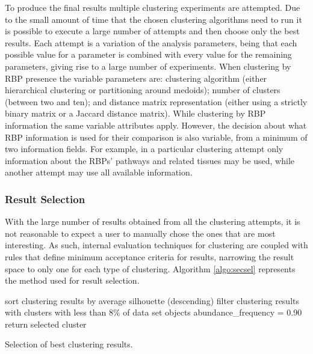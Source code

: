 To produce the final results multiple clustering experiments are attempted. Due
to the small amount of time that the chosen clustering algorithms need to run it
is possible to execute a large number of attempts and then choose only the best
results. Each attempt is a variation of the analysis parameters, being that each
possible value for a parameter is combined with every value for the remaining
parameters, giving rise to a large number of experiments. When clustering by RBP
presence the variable parameters are: clustering algorithm (either hierarchical
clustering or partitioning around medoids); number of clusters (between two and
ten); and distance matrix representation (either using a strictly binary matrix
or a Jaccard distance matrix). While clustering by RBP information the same
variable attributes apply. However, the decision about what RBP information is
used for their comparison is also variable, from a minimum of two information
fields. For example, in a particular clustering attempt only information about
the RBPs' pathways and related tissues may be used, while another attempt may
use all available information.

\subsubsection*{Result Selection}

With the large number of results obtained from all the clustering attempts, it
is not reasonable to expect a user to manually chose the ones that are most
interesting. As such, internal evaluation techniques for clustering are coupled
with rules that define minimum acceptance criteria for results, narrowing the
result space to only one for each type of clustering. Algorithm
\ref{algo:secsel} represents the method used for result selection.

\begin{algorithm}
  \LinesNumbered

  sort clustering results by average silhouette (descending)\;
  filter clustering results with clusters with less than 8\% of data set objects\;
  abundance\_frequency = 0.90\;
   {
    return selected cluster\;
  }

  \caption[Selection of best clustering results]{
    Selection of best clustering results.
  }
  \label{algo:secsel}
\end{algorithm}

